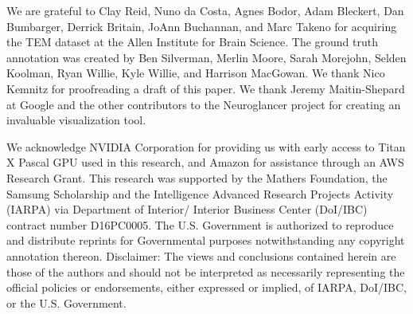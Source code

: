 \documentclass{article}
\begin{document}
We are grateful to Clay Reid, Nuno da Costa, Agnes Bodor, Adam Bleckert, Dan
Bumbarger, Derrick Britain, JoAnn Buchannan, and Marc Takeno for acquiring the
TEM dataset at the Allen Institute for Brain Science. The ground truth
annotation was created by Ben Silverman, Merlin Moore, Sarah Morejohn, Selden
Koolman, Ryan Willie, Kyle Willie, and Harrison MacGowan. We thank Nico Kemnitz
for proofreading a draft of this paper. We thank Jeremy Maitin-Shepard at Google
and the other contributors to the Neuroglancer project for creating an
invaluable visualization tool.

We acknowledge NVIDIA Corporation for providing us with early access to Titan X
Pascal GPU used in this research, and Amazon for assistance through an AWS
Research Grant. This research was supported by the Mathers Foundation, the
Samsung Scholarship and the Intelligence Advanced Research Projects Activity
(IARPA) via Department of Interior/ Interior Business Center (DoI/IBC) contract
number D16PC0005. The U.S. Government is authorized to reproduce and distribute
reprints for Governmental purposes notwithstanding any copyright annotation
thereon. Disclaimer: The views and conclusions contained herein are those of the
authors and should not be interpreted as necessarily representing the official
policies or endorsements, either expressed or implied, of IARPA, DoI/IBC, or the
U.S. Government.


\end{document}
